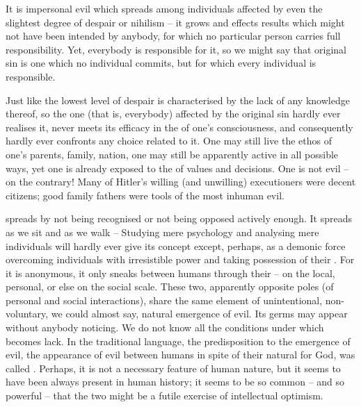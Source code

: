 %
It is impersonal evil which spreads among individuals affected by even the
slightest degree of despair or nihilism -- it grows and effects results which
might not have been intended by anybody, for which no particular person
 carries full responsibility.  Yet, everybody is responsible for it,
so we might say that original sin is one which no individual commits, but for
which every individual is responsible.

Just like the lowest level of despair is characterised by the lack of any
knowledge thereof, so the one (that is, everybody) affected by the original sin
hardly ever realises it, never meets its efficacy in the  of one's
consciousness, and consequently hardly ever confronts any  choice related
to it. One may still live the ethos of one's parents, family, nation, one may
still be apparently active in all possible ways, yet one is already exposed to
the  of values and  decisions.  One is not evil -- on
the contrary! Many of Hitler's willing (and unwilling) executioners were decent
citizens; good family fathers were tools of the most inhuman
evil.


 spreads by not being recognised or not being opposed
actively enough. It spreads as we sit and as we walk --  Studying mere psychology and analysing mere individuals will 
hardly ever give its concept except, perhaps, as a demonic force overcoming
individuals with irresistible power and taking possession of their .
For it is anonymous, it only sneaks between humans through their
 -- on the local, personal, or else on the social scale.
These two, apparently opposite poles (of personal and social interactions),
share the same element of unintentional, non-voluntary, we could almost say,
natural emergence of evil.  Its
germs may appear without anybody noticing. We do not know all the conditions
under which  becomes lack.  In the traditional language, the
 predisposition to the emergence of evil, the appearance of evil
between humans in spite of their natural  for God, was called
.  Perhaps, it is not a necessary feature of human nature, but
it seems to have been always present in human history; it seems to be so common
-- and so powerful -- that  the two might be a futile exercise
of intellectual optimism.



